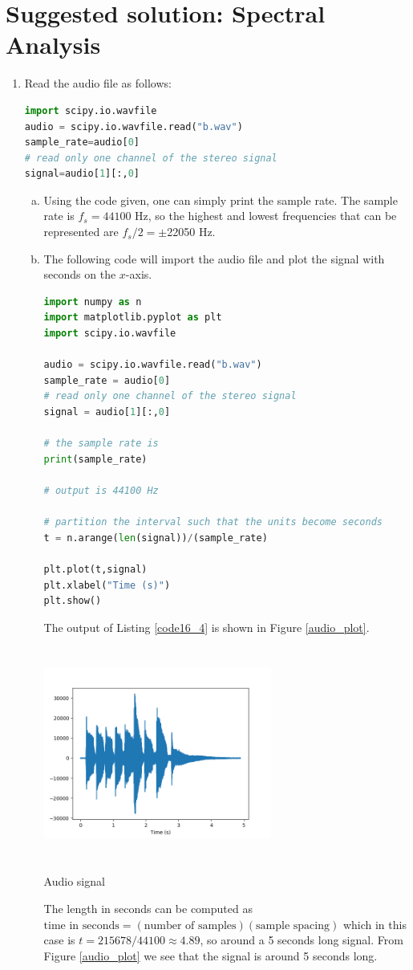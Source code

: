 \newpage
\section{Suggested solution: Spectral Analysis}

\begin{enumerate}
\item Read the audio file as follows:
\begin{lstlisting}[language=Python]
import scipy.io.wavfile
audio = scipy.io.wavfile.read("b.wav")
sample_rate=audio[0]
# read only one channel of the stereo signal
signal=audio[1][:,0]
\end{lstlisting}

\begin{enumerate}[a)]
\item Using the code given, one can simply print the sample rate. The sample rate is $f_s=44100$ Hz, so the highest and lowest frequencies that can be represented are $f_{s}/2=\pm$22050 Hz.

\item The following code will import the audio file and plot the signal with seconds on the $x$-axis. 
\begin{lstlisting}[language=Python, caption=Code to plot audio signal,label=code16_4]
import numpy as n
import matplotlib.pyplot as plt
import scipy.io.wavfile

audio = scipy.io.wavfile.read("b.wav")
sample_rate = audio[0]
# read only one channel of the stereo signal
signal = audio[1][:,0]

# the sample rate is
print(sample_rate)

# output is 44100 Hz

# partition the interval such that the units become seconds
t = n.arange(len(signal))/(sample_rate)

plt.plot(t,signal)
plt.xlabel("Time (s)")
plt.show()
\end{lstlisting}
The output of Listing \ref{code16_4} is shown in Figure \ref{audio_plot}.
\begin{marginfigure}
    \centering
    \includegraphics[width=7.5cm,height=7.0cm]{ch17/figures/audio.png}
    \caption{Audio signal}
    \label{audio_plot}
\end{marginfigure}
The length in seconds can be computed as $\text{time in seconds}=(\text{number of samples})(\text{sample spacing})$ which in this case is $t=215678/44100\approx 4.89$, so around a 5 seconds long signal. From Figure \ref{audio_plot} we see that the signal is around 5 seconds long. 


\end{enumerate}
\end{enumerate}
